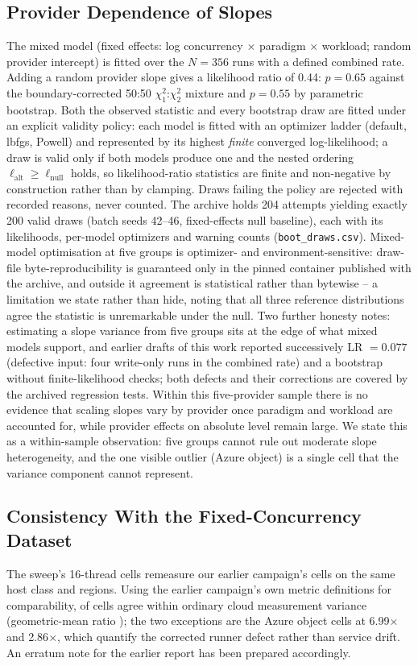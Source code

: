 \documentclass[manuscript,screen,review]{acmart}
\begin{document}
\subsection{Provider Dependence of Slopes}
The mixed model (fixed effects: log concurrency $\times$ paradigm $\times$
workload; random provider intercept) is fitted over the $N = 356$ runs with
a defined combined rate. Adding a random provider slope gives a likelihood
ratio of 0.44: $p = 0.65$ against the boundary-corrected 50:50
$\chi^2_1$:$\chi^2_2$ mixture and $p = 0.55$ by parametric bootstrap. Both
the observed statistic and every bootstrap draw are fitted under an
explicit validity policy: each model is fitted with an optimizer ladder
(default, lbfgs, Powell) and represented by its highest \emph{finite}
converged log-likelihood; a draw is valid only if both models produce one
and the nested ordering $\ell_{\mathrm{alt}} \geq \ell_{\mathrm{null}}$
holds, so likelihood-ratio statistics are finite and non-negative by
construction rather than by clamping. Draws failing the policy are
rejected with recorded reasons, never counted. The archive holds 204
attempts yielding exactly 200 valid draws (batch seeds 42--46,
fixed-effects null baseline), each with its likelihoods, per-model
optimizers and warning counts (\texttt{boot\_draws.csv}). Mixed-model
optimisation at five groups is optimizer- and environment-sensitive:
draw-file byte-reproducibility is guaranteed only in the pinned container
published with the archive, and outside it agreement is statistical rather
than bytewise -- a limitation we state rather than hide, noting that all
three reference distributions agree the statistic is unremarkable under
the null. Two further honesty notes: estimating a slope variance from
five groups sits at the edge of what mixed models support, and earlier
drafts of this work reported successively LR $= 0.077$ (defective input:
four write-only runs in the combined rate) and a bootstrap without
finite-likelihood checks; both defects and their corrections are covered
by the archived regression tests.
Within this five-provider sample there is no evidence that scaling slopes
vary by provider once paradigm and workload are accounted for, while
provider effects on absolute level remain large. We state this as a
within-sample observation: five groups cannot rule out moderate slope
heterogeneity, and the one visible outlier (Azure object) is a single cell
that the variance component cannot represent.

\subsection{Consistency With the Fixed-Concurrency Dataset}
The sweep's 16-thread cells remeasure our earlier campaign's cells
\cite{thesis} on the same host class and regions. Using the earlier
campaign's own metric definitions for comparability, \consCellsWithin{} of \consCellsTotal{} cells agree
within ordinary cloud measurement variance (geometric-mean ratio \consGeoMean); the
two exceptions are the Azure object cells at 6.99$\times$ and 2.86$\times$,
which quantify the corrected runner defect rather than service drift. An
erratum note for the earlier report has been prepared accordingly.
\end{document}
